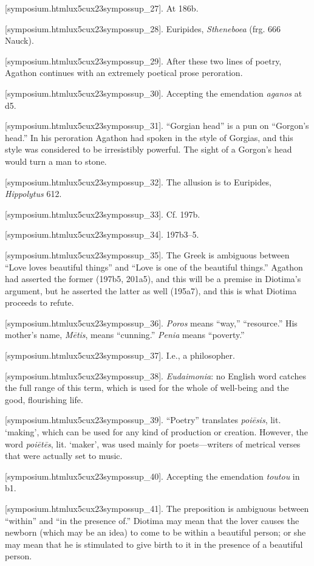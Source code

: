 [symposium.htmlux5cux23sympossup_27]. At 186b.

[symposium.htmlux5cux23sympossup_28]. Euripides,
{\em Stheneboea} (frg. 666 Nauck).

[symposium.htmlux5cux23sympossup_29]. After these two lines of
poetry, Agathon continues with an extremely poetical prose peroration.

[symposium.htmlux5cux23sympossup_30]. Accepting the emendation
{\em aganos} at d5.

[symposium.htmlux5cux23sympossup_31]. “Gorgian head” is a pun
on “Gorgon's head.” In his peroration Agathon had spoken in the style of
Gorgias, and this style was considered to be irresistibly powerful. The
sight of a Gorgon's head would turn a man to stone.

[symposium.htmlux5cux23sympossup_32]. The allusion is to
Euripides, {\em Hippolytus} 612.

[symposium.htmlux5cux23sympossup_33]. Cf. 197b.

[symposium.htmlux5cux23sympossup_34]. 197b3--5.

[symposium.htmlux5cux23sympossup_35]. The Greek is ambiguous
between “Love loves beautiful things” and “Love is one of the beautiful
things.” Agathon had asserted the former (197b5, 201a5), and this will
be a premise in Diotima's argument, but he asserted the latter as well
(195a7), and this is what Diotima proceeds to refute.

[symposium.htmlux5cux23sympossup_36]. {\em Poros} means “way,”
“resource.” His mother's name, {\em Mētis}, means “cunning.” {\em Penia}
means “poverty.”

[symposium.htmlux5cux23sympossup_37]. I.e., a philosopher.

[symposium.htmlux5cux23sympossup_38]. {\em Eudaimonia}: no
English word catches the full range of this term, which is used for the
whole of well-being and the good, flourishing life.

[symposium.htmlux5cux23sympossup_39]. “Poetry” translates
{\em poiēsis}, lit. ‘making', which can be used for any kind of
production or creation. However, the word {\em poiētēs}, lit. ‘maker',
was used mainly for poets---writers of metrical verses that were
actually set to music.

[symposium.htmlux5cux23sympossup_40]. Accepting the emendation
{\em toutou} in b1.

[symposium.htmlux5cux23sympossup_41]. The preposition is
ambiguous between “within” and “in the presence of.” Diotima may mean
that the lover causes the newborn (which may be an idea) to come to be
within a beautiful person; or she may mean that he is stimulated to give
birth to it in the presence of a beautiful person.

